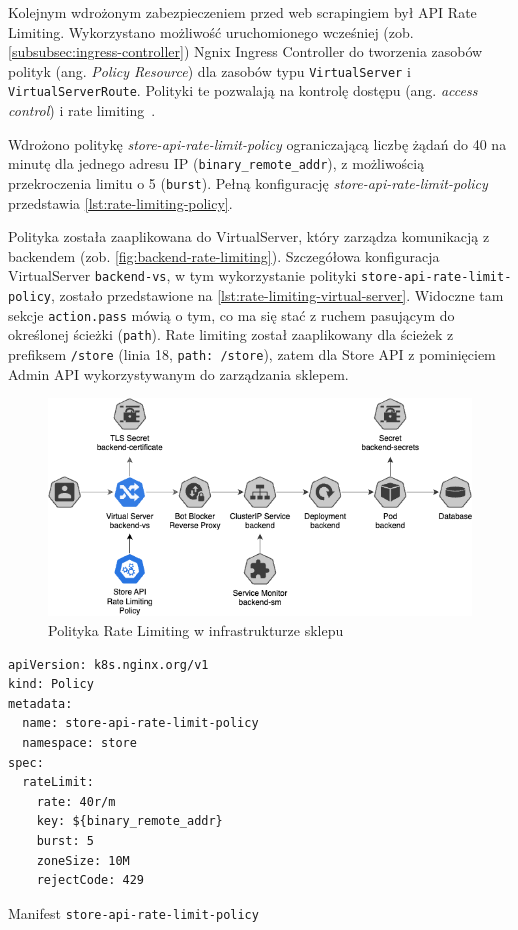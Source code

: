 Kolejnym wdrożonym zabezpieczeniem przed web scrapingiem był API Rate Limiting.
Wykorzystano możliwość uruchomionego wcześniej (zob. \autoref{subsubsec:ingress-controller}) Ngnix Ingress Controller
do tworzenia zasobów polityk (ang. \emph{Policy Resource}) dla zasobów typu \texttt{VirtualServer} i \texttt{VirtualServerRoute}.
Polityki te pozwalają na kontrolę dostępu (ang. \emph{access control}) i rate limiting~\cite{nginx-ingress-controller-policy-resource}.

Wdrożono politykę \emph{store-api-rate-limit-policy} ograniczającą liczbę żądań do 40 na minutę
dla jednego adresu IP (\texttt{binary\_remote\_addr}), z możliwością przekroczenia limitu o 5 (\texttt{burst}).
Pełną konfigurację \emph{store-api-rate-limit-policy} przedstawia \autoref{lst:rate-limiting-policy}.

Polityka została zaaplikowana do VirtualServer, który zarządza komunikacją z backendem (zob. \autoref{fig:backend-rate-limiting}).
Szczegółowa konfiguracja VirtualServer \texttt{backend-vs}, w tym wykorzystanie polityki \texttt{store-api-rate-limit-policy}, zostało przedstawione na \autoref{lst:rate-limiting-virtual-server}.
Widoczne tam sekcje \texttt{action.pass} mówią o tym, co ma się stać z ruchem pasującym do określonej ścieżki (\texttt{path}).
Rate limiting został zaaplikowany dla ścieżek z prefiksem \texttt{/store} (linia 18, \texttt{path: /store}), zatem dla Store API z pominięciem Admin API wykorzystywanym do zarządzania sklepem.


\begin{figure}[H]
    \centering
    \captionsetup{width=.8\linewidth}
    \includegraphics[width=\textwidth]{img/backend-rate-limiting}
    \caption{Polityka Rate Limiting w infrastrukturze sklepu}
    \label{fig:backend-rate-limiting}
\end{figure}

\begin{listing}[p]
    \begin{verbatim}
apiVersion: k8s.nginx.org/v1
kind: Policy
metadata:
  name: store-api-rate-limit-policy
  namespace: store
spec:
  rateLimit:
    rate: 40r/m
    key: ${binary_remote_addr}
    burst: 5
    zoneSize: 10M
    rejectCode: 429
    \end{verbatim}
    \caption{Manifest \texttt{store-api-rate-limit-policy}}
    \label{lst:rate-limiting-policy}
\end{listing}

